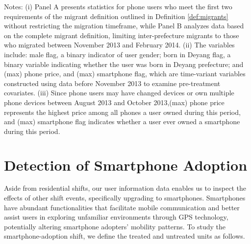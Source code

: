 \vspace{-2em}
\begin{singlespace}
\begin{footnotesize}
\noindent Notes: (i) Panel A presents statistics for phone users who meet the first two requirements of the migrant definition outlined in Definition \ref{def:migrants} without restricting the migration timeframe, while Panel B analyzes data based on the complete migrant definition, limiting inter-prefecture migrants to those who migrated between November 2013 and February 2014. (ii) The variables include: male flag, a binary indicator of user gender; born in Deyang flag, a binary variable indicating whether the user was born in Deyang prefecture; and (max) phone price, and (max) smartphone flag, which are time-variant variables constructed using data before November 2013 to examine pre-treatment covariates. (iii) Since phone users may have changed devices or own multiple phone devices between August 2013 and October 2013,(max) phone price represents the highest price among all phones a user owned during this period, and (max) smartphone flag indicates whether a user ever owned a smartphone during this period.
\end{footnotesize}
\end{singlespace}




\clearpage\newpage
\section{Detection of Smartphone Adoption}
Aside from residential shifts, our user information data enables us to inspect the effects of other shift events, specifically upgrading to smartphones.
Smartphones have abundant functionalities that facilitate mobile communication and better assist users in exploring unfamiliar environments through GPS technology, potentially altering smartphone adopters' mobility patterns.
To study the smartphone-adoption shift, we define the treated and untreated units as follows.

